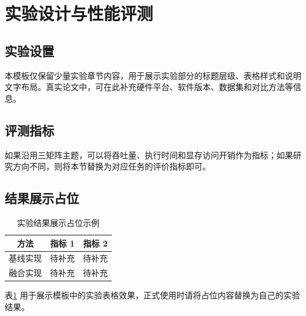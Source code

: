 \section{实验设计与性能评测}

\subsection{实验设置}

本模板仅保留少量实验章节内容，用于展示实验部分的标题层级、表格样式和说明文字布局。真实论文中，可在此补充硬件平台、软件版本、数据集和对比方法等信息。

\subsection{评测指标}

如果沿用三矩阵主题，可以将吞吐量、执行时间和显存访问开销作为指标；如果研究方向不同，则将本节替换为对应任务的评价指标即可。

\subsection{结果展示占位}

\begin{table}[htbp]
    \centering
    \caption{实验结果展示占位示例}
    \label{tab:experiment_placeholder}
    \begin{tabular}{ccc}
        \toprule
        方法 & 指标 1 & 指标 2 \\
        \midrule
        基线实现 & 待补充 & 待补充 \\
        融合实现 & 待补充 & 待补充 \\
        \bottomrule
    \end{tabular}
\end{table}

表\ref{tab:experiment_placeholder} 用于展示模板中的实验表格效果，正式使用时请将占位内容替换为自己的实验结果。
